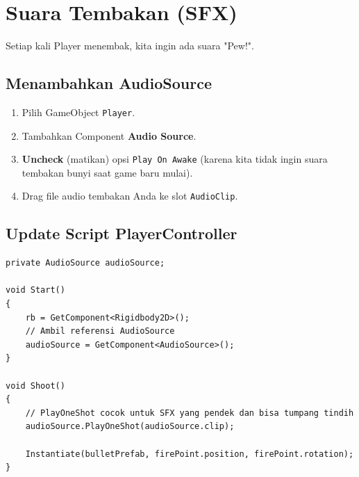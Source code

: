 
\section{Suara Tembakan (SFX)}

Setiap kali Player menembak, kita ingin ada suara "Pew!".

\subsection{Menambahkan AudioSource}
\begin{enumerate}
    \item Pilih GameObject \texttt{Player}.
    \item Tambahkan Component \textbf{Audio Source}.
    \item \textbf{Uncheck} (matikan) opsi \texttt{Play On Awake} (karena kita tidak ingin suara tembakan bunyi saat game baru mulai).
    \item Drag file audio tembakan Anda ke slot \texttt{AudioClip}.
\end{enumerate}

\subsection{Update Script PlayerController}
\begin{lstlisting}[language={[Sharp]C}]
private AudioSource audioSource;

void Start()
{
    rb = GetComponent<Rigidbody2D>();
    // Ambil referensi AudioSource
    audioSource = GetComponent<AudioSource>();
}

void Shoot()
{
    // PlayOneShot cocok untuk SFX yang pendek dan bisa tumpang tindih
    audioSource.PlayOneShot(audioSource.clip);
    
    Instantiate(bulletPrefab, firePoint.position, firePoint.rotation);
}
\end{lstlisting}
